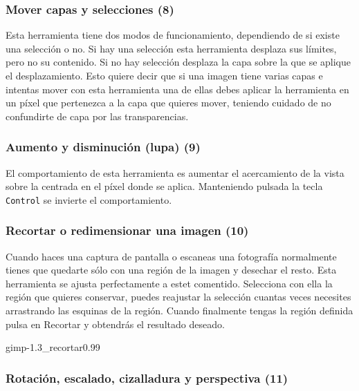 \subsubsection{Mover capas y selecciones (8)}

Esta herramienta tiene dos modos  de funcionamiento, dependiendo de si
existe  una selección  o no.  Si  hay una  selección esta  herramienta
desplaza  sus límites,  pero  no  su contenido.  Si  no hay  selección
desplaza  la capa  sobre la  que  se aplique  el desplazamiento.  Esto
quiere decir que si una imagen tiene varias capas e intentas mover con
esta herramienta una de ellas debes aplicar la herramienta en un píxel
que pertenezca  a la capa  que quieres  mover, teniendo cuidado  de no
confundirte de capa por las transparencias.

\subsubsection{Aumento y disminución (lupa) (9)}

El comportamiento de  esta herramienta es aumentar  el acercamiento de
la vista  sobre la centrada en  el píxel donde se  aplica. Manteniendo
pulsada la tecla {\tt Control} se invierte el comportamiento.

\subsubsection{Recortar o redimensionar una imagen (10)}

Cuando  haces  una  captura  de pantalla  o  escaneas  una  fotografía
normalmente tienes  que quedarte sólo  con una  región de la  imagen y
desechar el  resto. Esta herramienta  se ajusta perfectamente  a estet
comentido.  Selecciona  con  ella  la región  que  quieres  conservar,
puedes reajustar la selección  cuantas veces necesites arrastrando las
esquinas de  la región.  Cuando finalmente  tengas la  región definida
pulsa en {\sf Recortar} y obtendrás el resultado deseado.


\begin{figura}{gimp-1.3_recortar}{0.99}
\caption{Cuadro de díalogo para recortar imagen en }
\end{figura}


\subsubsection{Rotación, escalado, cizalladura y perspectiva (11)}


